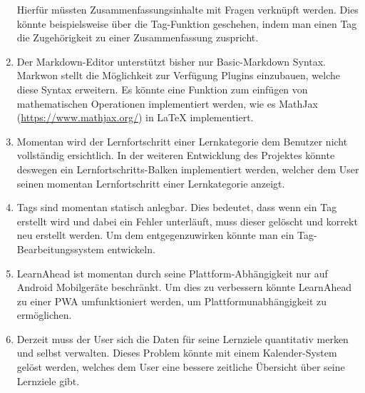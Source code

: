 \begin{enumerate}
    Hierfür müssten Zusammenfassungsinhalte mit Fragen verknüpft werden. Dies könnte beispielsweise über die Tag-Funktion geschehen, indem man einen Tag die Zugehörigkeit zu einer Zusammenfassung zuspricht.
    \item Der Markdown-Editor unterstützt bisher nur Basic-Markdown Syntax. Markwon stellt die Möglichkeit zur Verfügung Plugins einzubauen, welche diese Syntax erweitern. Es könnte eine Funktion zum einfügen von mathematischen Operationen implementiert werden, wie es MathJax (\href{https://www.mathjax.org/}{https://www.mathjax.org/}) in LaTeX implementiert.
    \item Momentan wird der Lernfortschritt einer Lernkategorie dem Benutzer nicht vollständig ersichtlich. In der weiteren Entwicklung des Projektes könnte deswegen ein Lernfortschritts-Balken implementiert werden, welcher dem User seinen momentan Lernfortschritt einer Lernkategorie anzeigt.
    \item Tags sind momentan statisch anlegbar. Dies bedeutet, dass wenn ein Tag erstellt wird und dabei ein Fehler unterläuft, muss dieser gelöscht und korrekt neu erstellt werden. Um dem entgegenzuwirken könnte man ein Tag-Bearbeitungssystem entwickeln.
    \item LearnAhead ist momentan durch seine Plattform-Abhängigkeit nur auf Android Mobilgeräte beschränkt. Um dies zu verbessern könnte LearnAhead zu einer PWA umfunktioniert werden, um Plattformunabhängigkeit zu ermöglichen.
    \item Derzeit muss der User sich die Daten für seine Lernziele quantitativ merken und selbst verwalten. Dieses Problem könnte mit einem Kalender-System gelöst werden, welches dem User eine bessere zeitliche Übersicht über seine Lernziele gibt.
\end{enumerate}
